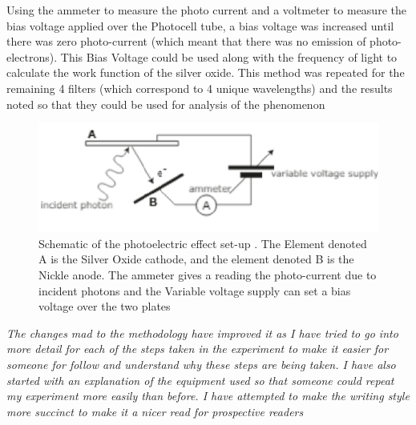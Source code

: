 \documentclass[12pt]{article}
\begin{document}
Using the ammeter to measure the photo current and a voltmeter to measure the bias voltage applied over the Photocell tube, a bias voltage was increased until there was zero photo-current (which meant that there was no emission of photo-electrons). This Bias Voltage could be used along with the frequency of light to calculate the work function of the silver oxide.
This method was repeated for the remaining 4 filters (which correspond to 4 unique wavelengths) and the results noted so that they could be used for analysis of the phenomenon\\
 \begin{figure}[ht!]
        \includegraphics[scale=0.5]{Screenshot (198).png}
        \caption{Schematic of the photoelectric effect set-up \cite{university physics}. The Element denoted A is the Silver Oxide cathode, and the element denoted B is the Nickle anode. The ammeter gives a reading the photo-current due to incident photons and the Variable voltage supply can set a bias voltage over the two plates}
        \label{fig:4}
\end{figure}

\textit{The changes mad to the methodology have improved it as I have tried to go into more detail for each of the steps taken in the experiment to make it easier for someone for follow and understand why these steps are being taken. I have also started with an explanation of the equipment used so that someone could repeat my experiment more easily than before. I have attempted to make the writing style more succinct to make it a nicer read for prospective readers}
\end{document}
